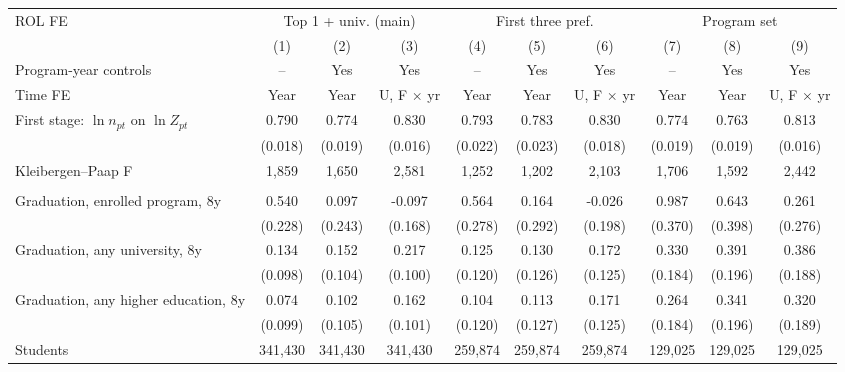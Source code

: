 \begin{tabular}{l*{9}{c}}
\toprule
ROL FE & \multicolumn{3}{c}{Top 1 + univ. (main)} & \multicolumn{3}{c}{First three pref.} & \multicolumn{3}{c}{Program set} \\
\cmidrule(lr){2-4}\cmidrule(lr){5-7}\cmidrule(lr){8-10}
 & (1) & (2) & (3) & (4) & (5) & (6) & (7) & (8) & (9) \\
Program-year controls & -- & Yes & Yes & -- & Yes & Yes & -- & Yes & Yes \\
Time FE & Year & Year & U, F \(\times\) yr & Year & Year & U, F \(\times\) yr & Year & Year & U, F \(\times\) yr \\
\midrule
First stage: \(\ln n_{pt}\) on \(\ln Z_{pt}\) & 0.790\sym{***} & 0.774\sym{***} & 0.830\sym{***} & 0.793\sym{***} & 0.783\sym{***} & 0.830\sym{***} & 0.774\sym{***} & 0.763\sym{***} & 0.813\sym{***} \\
 & (0.018) & (0.019) & (0.016) & (0.022) & (0.023) & (0.018) & (0.019) & (0.019) & (0.016) \\
Kleibergen--Paap F &  1,859 &  1,650 &  2,581 &  1,252 &  1,202 &  2,103 &  1,706 &  1,592 &  2,442 \\
\addlinespace
\multicolumn{10}{l}{2SLS (pp per 10\% more entrants)} \\
\quad Graduation, enrolled program, 8y &  0.540\sym{**} &  0.097 & -0.097 &  0.564\sym{**} &  0.164 & -0.026 &  0.987\sym{***} &  0.643 &  0.261 \\
 & (0.228) & (0.243) & (0.168) & (0.278) & (0.292) & (0.198) & (0.370) & (0.398) & (0.276) \\
\quad Graduation, any university, 8y &  0.134 &  0.152 &  0.217\sym{**} &  0.125 &  0.130 &  0.172 &  0.330\sym{*} &  0.391\sym{**} &  0.386\sym{**} \\
 & (0.098) & (0.104) & (0.100) & (0.120) & (0.126) & (0.125) & (0.184) & (0.196) & (0.188) \\
\quad Graduation, any higher education, 8y &  0.074 &  0.102 &  0.162 &  0.104 &  0.113 &  0.171 &  0.264 &  0.341\sym{*} &  0.320\sym{*} \\
 & (0.099) & (0.105) & (0.101) & (0.120) & (0.127) & (0.125) & (0.184) & (0.196) & (0.189) \\
\midrule
Students &   341,430 &   341,430 &   341,430 &   259,874 &   259,874 &   259,874 &   129,025 &   129,025 &   129,025 \\
\bottomrule
\end{tabular}
